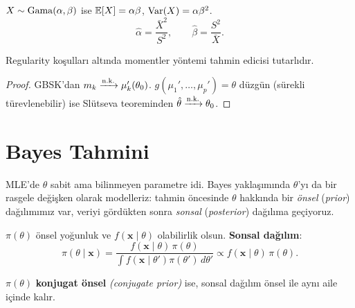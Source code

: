\begin{ornek}\label{ex:gama_momentler}
$X\sim\operatorname{Gama}(\alpha,\beta)$ ise $\mathbb{E}[X]=\alpha\beta$, $\operatorname{Var}(X)=\alpha\beta^2$.
\[
  \hat\alpha = \frac{\bar{X}^2}{S^2}, \qquad \hat\beta = \frac{S^2}{\bar{X}}.
\]
\end{ornek}

\begin{teorem}
Regularity koşulları altında momentler yöntemi tahmin edicisi tutarlıdır.
\end{teorem}

\begin{proof}
GBSK'dan $m_k \xrightarrow{\text{n.k.}} \mu_k'(\theta_0)$. $g(\mu_1',\ldots,\mu_p')=\theta$ düzgün (sürekli türevlenebilir) ise Slütseva teoreminden $\hat\theta \xrightarrow{\text{n.k.}} \theta_0$.
\end{proof}

\section{Bayes Tahmini}
\label{sec:bayes_tahmin}

\begin{kesif}
MLE'de $\theta$ sabit ama bilinmeyen parametre idi. Bayes yaklaşımında $\theta$'yı da bir rasgele değişken olarak modelleriz: tahmin öncesinde $\theta$ hakkında bir \emph{önsel} (\emph{prior}) dağılımımız var, veriyi gördükten sonra \emph{sonsal} (\emph{posterior}) dağılıma geçiyoruz.
\end{kesif}

\begin{tanim}\label{def:onsel_sonsal}
$\pi(\theta)$ önsel yoğunluk ve $f(\mathbf{x}\mid\theta)$ olabilirlik olsun. \textbf{Sonsal dağılım}:
\[
  \pi(\theta\mid\mathbf{x}) = \frac{f(\mathbf{x}\mid\theta)\,\pi(\theta)}{\int f(\mathbf{x}\mid\theta')\pi(\theta')\,d\theta'} \propto f(\mathbf{x}\mid\theta)\,\pi(\theta).
\]
\end{tanim}

\begin{tanim}\label{def:konjugat_onsel}
$\pi(\theta)$ \textbf{konjugat önsel} \emph{(conjugate prior)} ise, sonsal dağılım önsel ile aynı aile içinde kalır.
\end{tanim}

